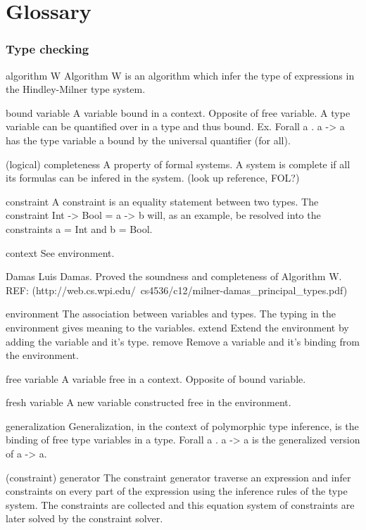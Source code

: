 \chapter{Glossary}

\subsection{Type checking}

algorithm W
Algorithm W is an algorithm which infer the type of expressions in the Hindley-Milner type system.

bound variable
A variable bound in a context. Opposite of free variable. A type variable can be quantified over in a type and thus bound. Ex. Forall a . a -> a has the type variable a bound by the universal quantifier (for all).

(logical) completeness
A property of formal systems. A system is complete if all its formulas can be infered in the system.
(look up reference, FOL?)

constraint
A constraint is an equality statement between two types.
The constraint Int -> Bool = a -> b will, as an example, be resolved into the constraints a = Int and b = Bool.

context
See environment.

Damas
Luis Damas. Proved the soundness and completeness of Algorithm W. REF: (http://web.cs.wpi.edu/~cs4536/c12/milner-damas_principal_types.pdf)

environment
The association between variables and types. The typing in the environment gives meaning to the variables. 
  extend
    Extend the environment by adding the variable and it's type.
  remove
    Remove a variable and it's binding from the environment.

free variable
A variable free in a context. Opposite of bound variable.

fresh variable
A new variable constructed free in the environment.

generalization
Generalization, in the context of polymorphic type inference, is the binding of free type variables in a type. Forall a . a -> a is the generalized version of a -> a. 

(constraint) generator
The constraint generator traverse an expression and infer constraints on every part of the expression using the inference rules of the type system. The constraints are collected and this equation system of constraints are later solved by the constraint solver.

